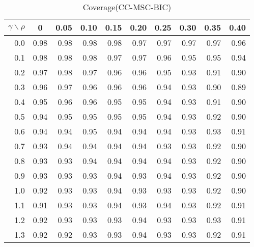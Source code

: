 \documentclass[12pt]{article}
\begin{document}
%
\begin{table}[!tbp]
\caption{Coverage(CC-MSC-BIC)}
 \begin{center}
 \begin{tabular}{r|rrrrrrrrr}\hline\hline
\multicolumn{1}{c|}{$\gamma\backslash\rho$}&\multicolumn{1}{c}{0}&\multicolumn{1}{c}{0.05}&\multicolumn{1}{c}{0.10}&\multicolumn{1}{c}{0.15}&\multicolumn{1}{c}{0.20}&\multicolumn{1}{c}{0.25}&\multicolumn{1}{c}{0.30}&\multicolumn{1}{c}{0.35}&\multicolumn{1}{c}{0.40}\tabularnewline
\hline
0.0&0.98&0.98&0.98&0.98&0.97&0.97&0.97&0.97&0.96\tabularnewline
0.1&0.98&0.98&0.98&0.97&0.97&0.96&0.95&0.95&0.94\tabularnewline
0.2&0.97&0.98&0.97&0.96&0.96&0.95&0.93&0.91&0.90\tabularnewline
0.3&0.96&0.97&0.96&0.96&0.96&0.94&0.93&0.90&0.89\tabularnewline
0.4&0.95&0.96&0.96&0.95&0.95&0.94&0.93&0.91&0.90\tabularnewline
0.5&0.94&0.95&0.95&0.95&0.95&0.94&0.93&0.92&0.90\tabularnewline
0.6&0.94&0.94&0.95&0.94&0.94&0.94&0.93&0.93&0.91\tabularnewline
0.7&0.93&0.94&0.94&0.94&0.94&0.93&0.93&0.92&0.90\tabularnewline
0.8&0.93&0.93&0.94&0.94&0.94&0.94&0.93&0.92&0.90\tabularnewline
0.9&0.93&0.93&0.93&0.94&0.93&0.94&0.93&0.92&0.90\tabularnewline
1.0&0.92&0.93&0.93&0.94&0.93&0.93&0.93&0.92&0.90\tabularnewline
1.1&0.91&0.93&0.93&0.94&0.93&0.94&0.93&0.92&0.91\tabularnewline
1.2&0.92&0.93&0.93&0.93&0.94&0.93&0.93&0.93&0.91\tabularnewline
1.3&0.92&0.92&0.93&0.93&0.94&0.93&0.93&0.92&0.91\tabularnewline
\hline
\end{tabular}

\end{center}

\end{table}
\end{document}
